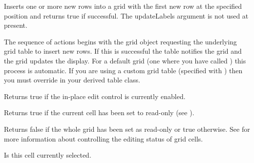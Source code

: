 
Inserts one or more new rows into a grid with the first new row at the specified
position and returns true if successful. The updateLabels argument is not used at
present. 

The sequence of actions begins with the grid object requesting the underlying grid
table to insert new rows. If this is successful the table notifies the grid and the
grid updates the display. For a default grid (one where you have called 
) this process is automatic. If you are
using a custom grid table (specified with ) 
then you must override 
 in your derived
table class.

\label{wxgridiscelleditcontrolenabled}


Returns true if the in-place edit control is currently enabled.

\label{wxgridiscurrentcellreadonly}


Returns true if the current cell has been set to read-only
(see ).

\label{wxgridiseditable}


Returns false if the whole grid has been set as read-only or true otherwise.
See  for more information about
controlling the editing status of grid cells.

\label{wxgridisinselection}



Is this cell currently selected.

\label{wxgridisreadonly}


